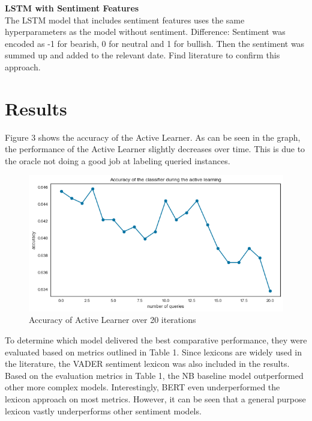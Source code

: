\documentclass[11pt, a4paper]{article}
\begin{document}
\noindent\textbf{LSTM with Sentiment Features}\\
The LSTM model that includes sentiment features uses the same hyperparameters as the model without sentiment.
Difference: Sentiment was encoded as -1 for bearish, 0 for neutral and 1 for bullish. Then the sentiment was summed up and added
to the relevant date. Find literature to confirm this approach.



\section{Results}

Figure 3 shows the accuracy of the Active Learner. As can be seen in the graph, the performance of the Active Learner slightly decreases over time. This is due to the oracle not doing a good
job at labeling queried instances.

\begin{figure}
    \centering
    \includegraphics[width=\textwidth]{ActiveLearner.png}
    \caption{Accuracy of Active Learner over 20 iterations}
    \label{fig:ActiveLearner}
\end{figure}

To determine which model delivered the best comparative performance, they were evaluated based on metrics outlined in Table 1. Since lexicons are widely used in the literature,
the VADER sentiment lexicon was also included in the results.
Based on the evaluation metrics in Table 1, the NB baseline model outperformed other more complex models. Interestingly, BERT even underperformed the lexicon approach on most metrics.
However, it can be seen that a general purpose lexicon vastly underperforms other sentiment models.
\end{document}
